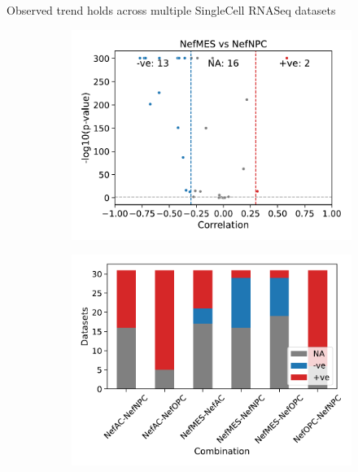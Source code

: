 \documentclass[aspectratio=169,9pt]{beamer}
\begin{document}
    \begin{frame}{Observed trend holds across multiple SingleCell RNASeq datasets}
        \begin{adjustwidth}{-5cm}{-5cm}
            \centering
            \begin{figure}\ContinuedFloat
                \centering
                \begin{subfigure}[c]{0.22\textwidth}
                    \centering
                    \includegraphics[width=\textwidth]{Volcano_SC_NefMES-NefNPC}
                \end{subfigure}
                \begin{subfigure}[c]{0.33\textwidth}
                    \centering
                    \includegraphics[width=\textwidth]{Bar_SC_Nef}

\end{subfigure}
\end{figure}
\end{adjustwidth}
\end{frame}
\end{document}

